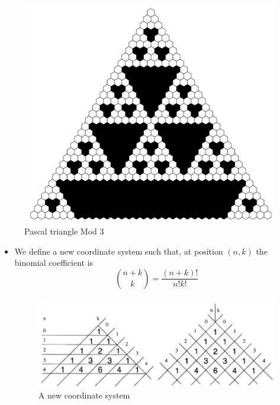 \documentclass{beamer}
\begin{document}
\begin{frame}
    \begin{figure}
        \includegraphics[scale=0.36]{PascalMod3.pdf}
        \caption{Pascal triangle Mod 3}
    \end{figure}
\end{frame}

\begin{frame}
    \begin{itemize}
        \item We define a new coordinate system such that, at position $(n,k)$ the binomial coefficient is 
        \begin{equation*}
            \binom{n+k}{k} = \frac{(n+k)!}{n!k!}
        \end{equation*}
        \begin{figure}
            \centering
            \includegraphics[scale=0.39]{newCoordinate.png}
            \caption{A new coordinate system}
        \end{figure}
    \end{itemize}
    \let\thefootnote\relax{}
\end{frame}
\end{document}
